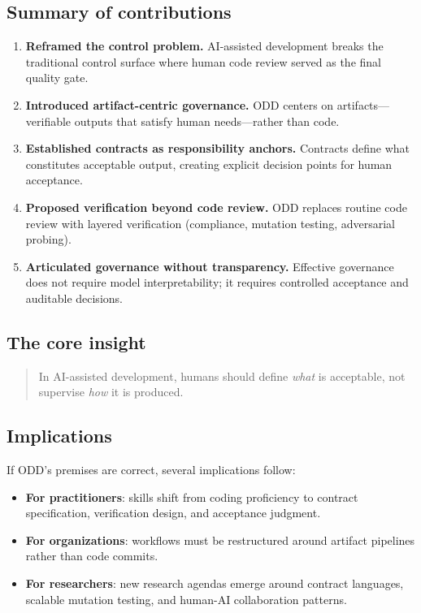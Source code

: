 \documentclass[conference]{IEEEtran}
\begin{document}
\subsection{Summary of contributions}
\begin{enumerate}
\item \textbf{Reframed the control problem.} AI-assisted development breaks the traditional control surface where human code review served as the final quality gate.
\item \textbf{Introduced artifact-centric governance.} ODD centers on artifacts---verifiable outputs that satisfy human needs---rather than code.
\item \textbf{Established contracts as responsibility anchors.} Contracts define what constitutes acceptable output, creating explicit decision points for human acceptance.
\item \textbf{Proposed verification beyond code review.} ODD replaces routine code review with layered verification (compliance, mutation testing, adversarial probing).
\item \textbf{Articulated governance without transparency.} Effective governance does not require model interpretability; it requires controlled acceptance and auditable decisions.
\end{enumerate}

\subsection{The core insight}
\begin{quote}
In AI-assisted development, humans should define \emph{what} is acceptable, not supervise \emph{how} it is produced.
\end{quote}

\subsection{Implications}
If ODD's premises are correct, several implications follow:
\begin{itemize}
\item \textbf{For practitioners}: skills shift from coding proficiency to contract specification, verification design, and acceptance judgment.
\item \textbf{For organizations}: workflows must be restructured around artifact pipelines rather than code commits.
\item \textbf{For researchers}: new research agendas emerge around contract languages, scalable mutation testing, and human-AI collaboration patterns.
\end{itemize}
\end{document}
